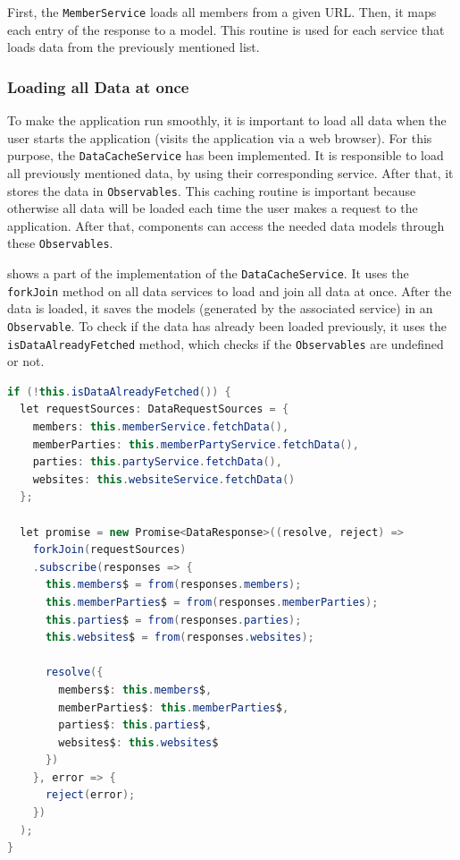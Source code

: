 First, the \texttt{MemberService} loads all members from a given URL. Then, it maps each entry of the response to a model.
This routine is used for each service that loads data from the previously mentioned list.


\subsubsection{Loading all Data at once}\label{subsubsec:02_impl_data_loadingAll}
To make the application run smoothly, it is important to load all data when the user starts the application (visits the application via a web browser).
For this purpose, the \texttt{DataCacheService} has been implemented. It is responsible to load all previously mentioned data, by using their corresponding service. After that, it stores the data in \texttt{Observables}. This caching routine is important because otherwise all data will be loaded each time the user makes a request to the application.
After that, components can access the needed data models through these \texttt{Observables}.


 shows a part of the implementation of the \texttt{DataCacheService}. It uses the \texttt{forkJoin} method on all data services to load and join all data at once. After the data is loaded, it saves the models (generated by the associated service) in an \texttt{Observable}.
To check if the data has already been loaded previously, it uses the \texttt{isDataAlreadyFetched} method, which checks if the \texttt{Observables} are undefined or not.
\begin{lstlisting}[label=lst:02_impl_data_dataserviceloading, caption=Implementation of fetching all data at once, language=java]
if (!this.isDataAlreadyFetched()) {
  let requestSources: DataRequestSources = {
    members: this.memberService.fetchData(),
    memberParties: this.memberPartyService.fetchData(),
    parties: this.partyService.fetchData(),
    websites: this.websiteService.fetchData()
  };

  let promise = new Promise<DataResponse>((resolve, reject) =>
    forkJoin(requestSources)
    .subscribe(responses => {
      this.members$ = from(responses.members);
      this.memberParties$ = from(responses.memberParties);
      this.parties$ = from(responses.parties);
      this.websites$ = from(responses.websites);

      resolve({
        members$: this.members$,
        memberParties$: this.memberParties$,
        parties$: this.parties$,
        websites$: this.websites$
      })
    }, error => {
      reject(error);
    })
  );
}
\end{lstlisting}


